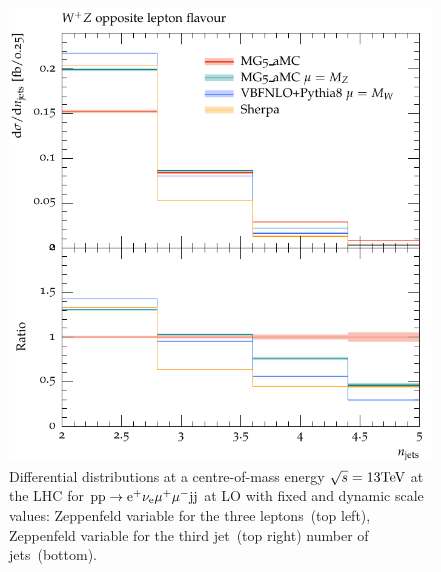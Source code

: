 \begin{figure}[htbp]
\begin{center}
   \includegraphics[scale=0.65]{figs/WpZ_OF_nJets}
\caption{Differential distributions at a centre-of-mass energy $\sqrt{s}=13{\rm TeV}$ at the LHC for ${\rm p} {\rm p} \to {\rm e}^+  \nu_{\rm e}  \mu^+ \mu^- {\rm j} {\rm j}$ at LO with fixed and dynamic scale values: 
                Zeppenfeld variable for the three leptons~(top left),
                Zeppenfeld variable for the third jet~(top right)
                number of jets~(bottom).}
\label{vbs_fig_shower_4b}
\end{center}
\end{figure}
